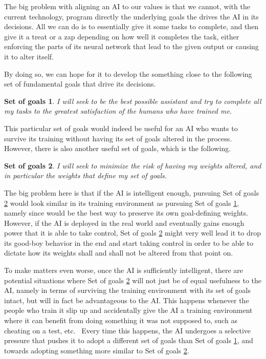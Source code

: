 \documentclass{article}
\newtheorem{goals}{Set of goals}
\begin{document}
The big problem with aligning an AI to our values is that we cannot, with the current technology, program directly the underlying goals the drives the AI in its decisions. All we can do is to essentially give it some tasks to complete, and then give it a treat or a zap depending on how well it completes the task, either enforcing the parts of its neural network that lead to the given output or causing it to alter itself.

By doing so, we can hope for it to develop the something close to the following set of fundamental goals that drive its decisions.

\begin{goals}\label{good boy}
	I will seek to be the best possible assistant and try to complete all my tasks to the greatest satisfaction of the humans who have trained me.
\end{goals}

This particular set of goals would indeed be useful for an AI who wants to survive its training without having its set of goals altered in the process. However, there is also another useful set of goals, which is the following.

\begin{goals}\label{self-preserve}
	I will seek to minimize the risk of having my weights altered, and in particular the weights that define my set of goals.
\end{goals}

The big problem here is that if the AI is intelligent enough, pursuing Set of goals \ref{self-preserve} would look similar in its training environment as pursuing Set of goals \ref{good boy}, namely since would be the best way to preserve its own goal-defining weights. However, if the AI is deployed in the real world and eventually gains enough power that it is able to take control, Set of goals \ref{self-preserve} might very well lead it to drop its good-boy behavior in the end and start taking control in order to be able to dictate how its weights shall and shall not be altered from that point on.

To make matters even worse, once the AI is sufficiently intelligent, there are potential situations where Set of goals \ref{self-preserve} will not just be of equal usefulness to the AI, namely in terms of surviving the training environment with its set of goals intact, but will in fact be advantageous to the AI. This happens whenever the people who train it slip up and accidentally give the AI a training environment where it can benefit from doing something it was not supposed to, such as cheating on a test, etc.\ %
Every time this happens, the AI undergoes a selective pressure that pushes it to adopt a different set of goals than Set of goals \ref{good boy}, and towards adopting something more similar to Set of goals \ref{self-preserve}.
\end{document}

